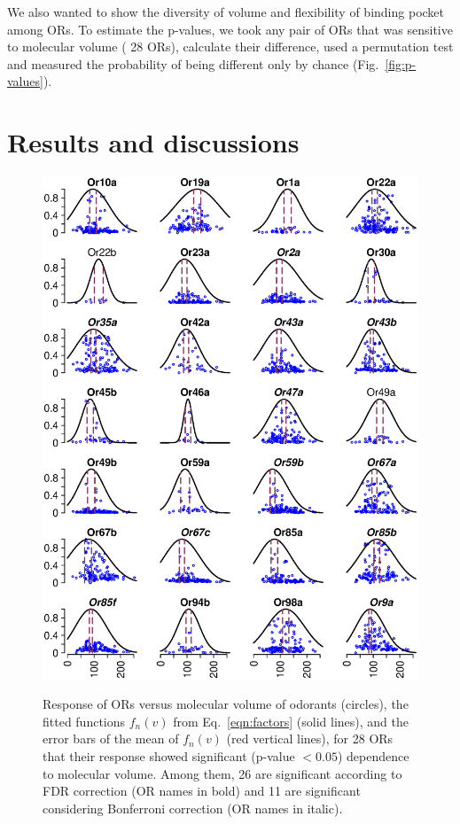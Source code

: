 \documentclass[11pt]{paper} %
\newcommand{\numberofreceptors}{ 28 }
\newcommand{\bonferroni}{ 11 }
\newcommand{\fdr}{ 26 }
\begin{document}
We also wanted to show the diversity of volume and flexibility of binding pocket among ORs.
To estimate the p-values, 
we took any pair of ORs that was sensitive to molecular volume (\numberofreceptors ORs),
calculate their difference, 
used a permutation test and measured the probability of being different only by chance (Fig.~\ref{fig:p-values}).



\section*{Results and discussions}
\begin{figure}
	\centering
		\includegraphics[width=0.8 \textwidth]{vol-res-}
		\label{fig:vol-res:all}		
	\caption{Response of ORs  versus molecular volume of odorants (circles),  
			the fitted functions $f_n(v)$ from Eq.~\ref{eqn:factors} (solid lines), 
			and the error bars of the mean of $f_n(v)$ (red vertical lines), 
			for \numberofreceptors ORs that their response showed significant (p-value $<0.05$) dependence to molecular volume. 
			Among them, \fdr are significant according to FDR correction (OR names in bold) and 
			\bonferroni are significant considering Bonferroni correction (OR names in italic).
		}
	\label{fig:vol-res}
\end{figure}
\end{document}
